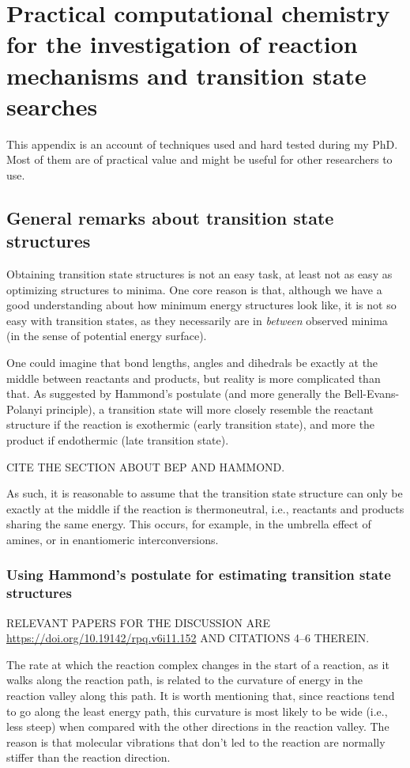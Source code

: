 \chapter{Practical computational chemistry for the investigation of reaction
mechanisms and transition state searches}%
\label{ch:tutorial}

This appendix is an account of techniques used and hard tested during my PhD.
Most of them are of practical value and might be useful for other researchers
to use.

\section{General remarks about transition state structures}

Obtaining transition state structures is not an easy task, at least not as easy
as optimizing structures to minima.
One core reason is that, although we have a good understanding about how
minimum energy structures look like, it is not so easy with transition states,
as they necessarily are in \emph{between} observed minima (in the sense of
potential energy surface).

One could imagine that bond lengths, angles and dihedrals be exactly at the
middle between reactants and products, but reality is more complicated than
that.
As suggested by Hammond's postulate (and more generally the Bell-Evans-Polanyi
principle), a transition state will more closely resemble the reactant
structure if the reaction is exothermic (early transition state), and more the
product if endothermic (late transition state).

CITE THE SECTION ABOUT BEP AND HAMMOND.\@

As such, it is reasonable to assume that the transition state structure can
only be exactly at the middle if the reaction is thermoneutral, i.e., reactants
and products sharing the same energy.
This occurs, for example, in the umbrella effect of amines, or in enantiomeric
interconversions.

\subsection{Using Hammond's postulate for estimating transition state
structures}

RELEVANT PAPERS FOR THE DISCUSSION ARE
\url{https://doi.org/10.19142/rpq.v6i11.152} AND CITATIONS 4--6 THEREIN.\@

The rate at which the reaction complex changes in the start of a reaction, as
it walks along the reaction path, is related to the curvature of energy in the
reaction valley along this path.
It is worth mentioning that, since reactions tend to go along the least energy
path, this curvature is most likely to be wide (i.e., less steep) when compared
with the other directions in the reaction valley.
The reason is that molecular vibrations that don't led to the reaction are
normally stiffer than the reaction direction.

